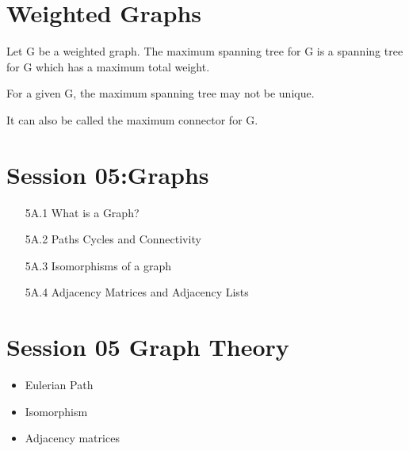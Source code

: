 \section*{Weighted Graphs}
Let G be a weighted graph.
The maximum spanning tree for G is a spanning tree for G which has a maximum total weight.

For a given G, the maximum spanning tree may not be unique.

It can also be called the maximum connector for G.


\section*{Session 05:Graphs}
\begin{itemize}
\item[5A.1] What is a Graph?
\item[5A.2] Paths Cycles and Connectivity
\item[5A.3] Isomorphisms of a graph
\item[5A.4] Adjacency Matrices and Adjacency Lists
\end{itemize}



\section*{Session 05 Graph Theory}
\begin{itemize}
	\item Eulerian Path
	\item Isomorphism
	\item Adjacency matrices
\end{itemize}





